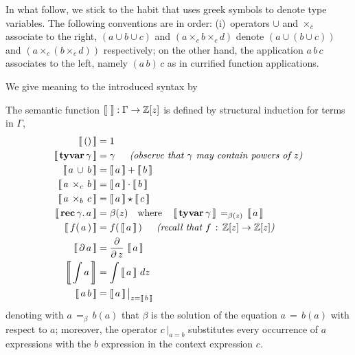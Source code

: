 In what follow, we stick to the habit that uses greek symbols to denote type
variables. The following conventions are in order: (i)~operators $\cup$ and
$\times_{c}$ associate to the right, $(a \cup b \cup c)$ and $(a \times_{c} b
\times_{c} d)$ denote $\left(a \cup (b \cup c)\right)$ and $(a \times_{c} (b
\times_{c} d))$ respectively; on the other hand, the application $a\,b\,c$
associates to the left, namely $(a\,b)\,c$ as in currified function
applications.

We give meaning to the introduced syntax by 
\begin{definition}[Semantic]
The semantic function $\left\llbracket\,\,\right\rrbracket: \Gamma \rightarrow
\mathbb{Z}[z]$ is defined by structural induction for terms in $\Gamma$,
\begin{displaymath}
\begin{split}
    \semantic{()} &= 1 \\
    \semantic{\textbf{tyvar}\,\gamma} &= \gamma\indent\textit{(observe that $\gamma$ may contain powers of $z$)} \\
    \semantic{a\,\cup\,b} &= \semantic{a} + \semantic{b} \\
    \semantic{a\,\times_{c}\,b} &= \semantic{a}\cdot\semantic{b} \\
    \semantic{a\,\times_{b}\,c} &= \semantic{a}\star\semantic{c} \\
    \semantic{\textbf{rec}\,\gamma.\,a} &= \beta(z)  \quad\text{where}\quad
        \semantic{\textbf{tyvar}\,\gamma}\,=_{\beta(z)}\,\semantic{a}\\
    \semantic{f(\,a\,)} &= f(\,\semantic{a}\,)\indent\textit{(recall that $f\,:\,\mathbb{Z}[z]\rightarrow\mathbb{Z}[z]$)}\\
    \semantic{\partial\,a} &= \frac{\partial}{\partial\,z}\,\semantic{a}\\
    \semantic{\int{a}} &= \int{\semantic{a}\,dz}\\
    \semantic{a\,b} &= \semantic{a}\big|_{z=\semantic{b}}\\
\end{split}
\end{displaymath}
denoting with $a\,=_{\beta}\,b(a)$ that $\beta$ is the solution of the equation
$a\,=\,b(a)$ with respect to $a$; moreover, the operator $c\,\big|_{a=b}$
substitutes every occurrence of $a$ expressions with the $b$ expression in the
context expression $c$.
\end{definition}

